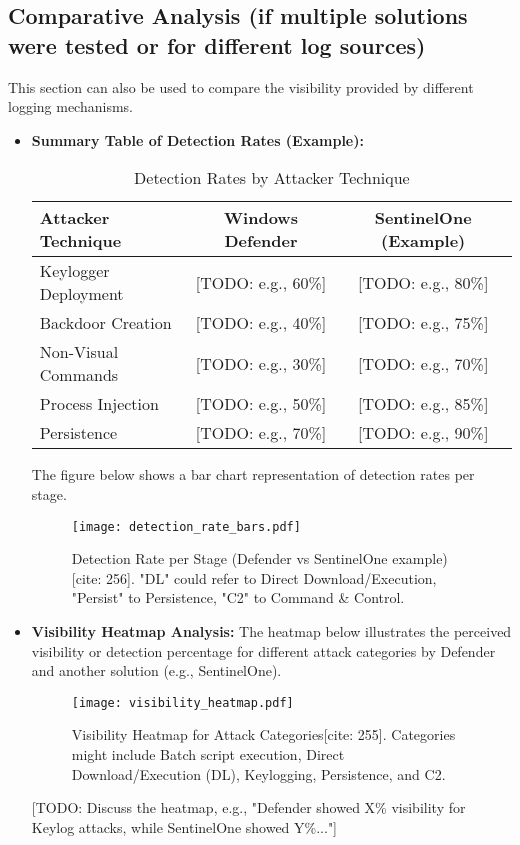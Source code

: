 \documentclass[11pt]{article}
\begin{document}
	\subsection{Comparative Analysis (if multiple solutions were tested or for different log sources)}
	This section can also be used to compare the visibility provided by different logging mechanisms.
	\begin{itemize}
		\item \textbf{Summary Table of Detection Rates (Example):}
		\begin{table}[H]
			\centering
			\caption{Detection Rates by Attacker Technique}
			\label{tab:detection_rates}
			\begin{tabular}{lcc}
				\toprule
				Attacker Technique & Windows Defender & SentinelOne (Example) \\
				\midrule
				Keylogger Deployment & [TODO: e.g., 60\%] & [TODO: e.g., 80\%] \\
				Backdoor Creation & [TODO: e.g., 40\%] & [TODO: e.g., 75\%] \\
				Non-Visual Commands & [TODO: e.g., 30\%] & [TODO: e.g., 70\%] \\
				Process Injection & [TODO: e.g., 50\%] & [TODO: e.g., 85\%] \\
				Persistence & [TODO: e.g., 70\%] & [TODO: e.g., 90\%] \\
				\bottomrule
			\end{tabular}
		\end{table}
		The figure below shows a bar chart representation of detection rates per stage.
		\begin{figure}[H]
			\centering
			\texttt{[image: detection\_rate\_bars.pdf]}
			\caption{Detection Rate per Stage (Defender vs SentinelOne example)[cite: 256]. "DL" could refer to Direct Download/Execution, "Persist" to Persistence, "C2" to Command & Control.} %
			\label{fig:detection_bars}
		\end{figure}
		
		\item \textbf{Visibility Heatmap Analysis:}
		The heatmap below illustrates the perceived visibility or detection percentage for different attack categories by Defender and another solution (e.g., SentinelOne).
		\begin{figure}[H]
			\centering
			\texttt{[image: visibility\_heatmap.pdf]}
			\caption{Visibility Heatmap for Attack Categories[cite: 255]. Categories might include Batch script execution, Direct Download/Execution (DL), Keylogging, Persistence, and C2.} %
			\label{fig:visibility_heatmap}
		\end{figure}
		[TODO: Discuss the heatmap, e.g., "Defender showed X\% visibility for Keylog attacks, while SentinelOne showed Y\%..."]
		

\end{itemize}
\end{document}
